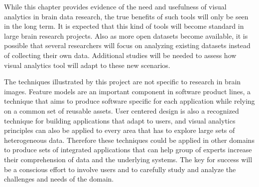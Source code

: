 While this chapter provides evidence of the need and usefulness of visual analytics in brain data research, the true benefits of such tools will only be seen in the long term. It is expected that this kind of tools will become standard in large brain research projects. Also as more open datasets become available, it is possible that several researchers will focus on analyzing existing datasets instead of collecting their own data. Additional studies will be needed to assess how visual analytics tool will adapt to these new scenarios. 



The techniques illustrated by this project are not specific to research in brain images. Feature models are an important component in software product lines, a technique that aims to produce software specific for each application while relying on a common set of reusable assets. User centered design is also a recognized technique for building applications that adapt to users, and visual analytics principles can also be applied to every area that has to explore large sets of heterogeneous data. Therefore these techniques could be applied in other domains to produce sets of integrated applications that can help group of experts increase their comprehension of  data and the underlying systems. The key for success will be a conscious effort to involve users and to carefully study and analyze the challenges and needs of the domain. 
